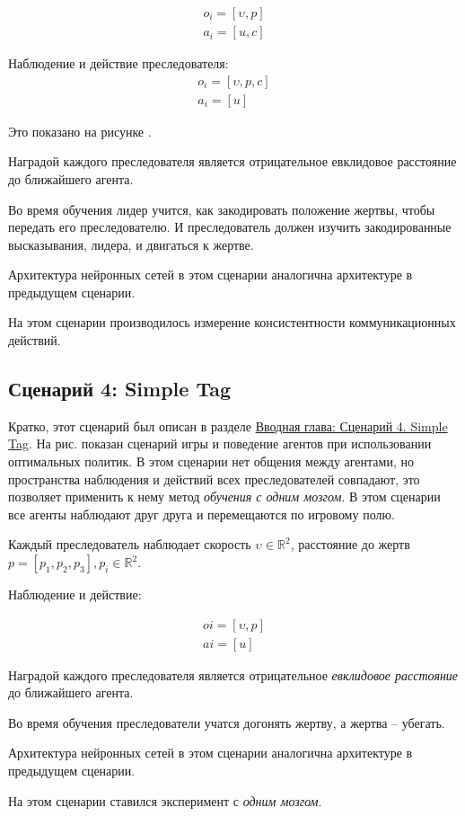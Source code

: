 \begin{equation}
    \begin{multlined}
        o_i = [\upsilon, p] \\
        a_i = [u, c]
    \end{multlined}
\end{equation}

Наблюдение и действие преследователя:
\begin{equation}
    \begin{multlined}
        o_i = [\upsilon, p, c] \\
        a_i = [u]
    \end{multlined}
\end{equation}

Это показано на рисунке .

Наградой каждого преследователя является отрицательное евклидовое расстояние до ближайшего агента.

Во время обучения лидер учится, как закодировать положение жертвы, чтобы передать его преследователю. И преследователь должен изучить закодированные высказывания, лидера, и двигаться к жертве.

Архитектура нейронных сетей в этом сценарии аналогична архитектуре в предыдущем сценарии.

На этом сценарии производилось измерение консистентности коммуникационных действий.

\subsection{Сценарий 4: Simple Tag} \label{exp-st}

Кратко, этот сценарий был описан в разделе \hyperref[intro-st]{Вводная глава: Сценарий 4. Simple Tag}. На рис.  показан сценарий игры и поведение агентов при использовании оптимальных политик. В этом сценарии нет общения между агентами, но пространства наблюдения и действий всех преследователей совпадают, это позволяет применить к нему метод \textit{обучения с одним мозгом}. В этом сценарии все агенты наблюдают друг друга и перемещаются по игровому полю.

Каждый преследователь наблюдает скорость $\upsilon \in \mathbb{R}^2$, расстояние до жертв $p = [p_1, p_2, p_3], p_i \in \mathbb{R}^2$.

Наблюдение и действие:

\begin{equation}
    \begin{multlined}
        oi = [\upsilon, p] \\
        ai = [u]
    \end{multlined}
\end{equation}

Наградой каждого преследователя является отрицательное \textit{евклидовое расстояние} до ближайшего агента.

Во время обучения преследователи учатся догонять жертву, а жертва – убегать.

Архитектура нейронных сетей в этом сценарии аналогична архитектуре в предыдущем сценарии.

На этом сценарии ставился эксперимент с \textit{одним мозгом}.

\newpage
